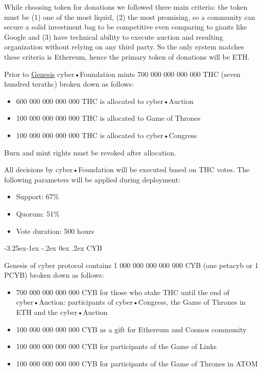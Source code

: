 \documentclass[8pt,oneside]{amsart}
\makeatletter
\renewcommand\subsection{\@startsection{subsection}{2}{\z@}%
                                     {-3.25ex\@plus -1ex \@minus -.2ex}%
                                     {0ex \@plus .2ex}%
                                     {\play\Large}}%
\newcommand{\titleSection}[1]{\subsection{#1}}
\newcommand{\code}[1]{{\PlayBold #1}}
\newenvironment{Figure}
  {\par\medskip\noindent\minipage{\linewidth}}
  {\endminipage\par\medskip}
\makeatother
\begin{document}
While choosing token for donations we followed three main criteria: the token must be (1) one of the most liquid, (2) the most promising, so a community can secure a solid investment bag to be competitive even comparing to giants like Google and (3) have technical ability to execute auction and resulting organization without relying on any third party. So the only system matches these criteria is Ethereum, hence the primary token of donations will be ETH.

Prior to \hyperlink{genesis}{Genesis} cyber•Foundation mints 700 000 000 000 000 THC (seven hundred terathc) broken down as follows:

\begin{itemize}
\item 600 000 000 000 000 THC is allocated to cyber•Auction
\item 100 000 000 000 000 THC is allocated to Game of Thrones
\item 100 000 000 000 000 THC is allocated to cyber•Congress
\end{itemize}

\begin{Figure}
 \centering
 
\end{Figure}

Burn and mint rights must be revoked after allocation.

All decisions by cyber•Foundation will be executed based on THC votes. The following parameters will be applied during deployment:

\begin{itemize}
\item Support: 67\%
\item Quorum: 51\%
\item Vote duration: 500 hours
\end{itemize}

\titleSection{CYB}\label{cyb}

Genesis of \code{cyber} protocol contains 1 000 000 000 000 000 CYB (one petacyb or 1 PCYB) broken down as follows:

\begin{itemize}
\item 700 000 000 000 000 CYB for those who stake THC until the end of cyber•Auction: participants of cyber•Congress, the Game of Thrones in ETH and the cyber•Auction
\item 100 000 000 000 000 CYB as a gift for Ethereum and Cosmos community
\item 100 000 000 000 000 CYB for participants of the Game of Links
\item 100 000 000 000 000 CYB for participants of the Game of Thrones in ATOM

\end{itemize}
\end{document}
